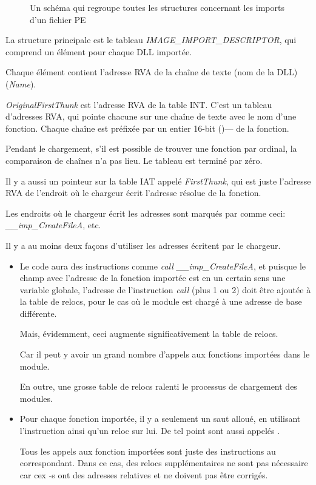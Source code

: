 \begin{figure}[H]
\centering
{}
\caption{
Un schéma qui regroupe toutes les structures concernant les imports d'un fichier PE}
\end{figure}

La structure principale est le tableau \emph{IMAGE\_IMPORT\_DESCRIPTOR}, qui comprend
un élément pour chaque DLL importée.

Chaque élément contient l'adresse \ac{RVA} de la chaîne de texte (nom de la DLL) (\emph{Name}).

\emph{OriginalFirstThunk} est l'adresse \ac{RVA} de la table \ac{INT}.
C'est un tableau d'adresses \ac{RVA}, qui pointe chacune sur une chaîne de texte
avec le nom d'une fonction.
Chaque chaîne est préfixée par un entier 16-bit ()--- de la fonction.

Pendant le chargement, s'il est possible de trouver une fonction par ordinal, la
comparaison de chaînes n'a pas lieu. Le tableau est terminé par zéro.

Il y a aussi un pointeur sur la table \ac{IAT} appelé \emph{FirstThunk}, qui est juste
l'adresse \ac{RVA} de l'endroit où le chargeur écrit l'adresse résolue de la fonction.

Les endroits où le chargeur écrit les adresses sont marqués par \IDA comme ceci:
\emph{\_\_imp\_CreateFileA}, etc.

Il y a au moins deux façons d'utiliser les adresses écritent par le chargeur.

\begin{itemize}
\item Le code aura des instructions comme \emph{call \_\_imp\_CreateFileA}, et puisque
le champ avec l'adresse de la fonction importée est en un certain sens une variable
globale, l'adresse de l'instruction \emph{call} (plus 1 ou 2) doit être ajoutée à la
table de relocs, pour le cas où le module est chargé à une adresse de base différente.

Mais, évidemment, ceci augmente significativement la table de relocs.

Car il peut y avoir un grand nombre d'appels aux fonctions importées dans le module.

En outre, une grosse table de relocs ralenti le processus de chargement des modules.

\item Pour chaque fonction importée, il y a seulement un saut alloué, en utilisant
l'instruction \JMP ainsi qu'un reloc sur lui.
De tel point sont aussi appelés .

Tous les appels aux fonction importées sont juste des instructions \CALL au 
correspondant. Dans ce cas, des relocs supplémentaires ne sont pas nécessaire car
cex \CALL{}-s ont des adresses relatives et ne doivent pas être corrigés.
\end{itemize}

